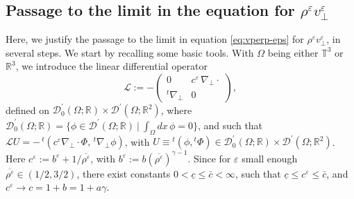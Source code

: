 \documentclass[11pt,reqno]{amsart}
\def \R{{\mathbb{R}}}
\def \T{{\mathbb{T}}}
\begin{document}

\subsection{Passage to the limit in the equation for $\rho^\varepsilon v_\perp^\varepsilon $}
\label{ss:cv-rvperp-P}
Here, we justify the passage to the limit in equation \eqref{eq:vperp-eps} for $\rho^\varepsilon v_\perp^\varepsilon$, in several steps.
We start by recalling some basic tools. With $\Omega$ being either $\T^3$ or $\R^3$, we introduce the linear differential operator
\begin{equation}
  \label{eqn:LDOL}
  \mathcal L := -\left (\begin{array}{cc}
0 &   c^\varepsilon \, \nabla_\perp \cdot \\
{}^t \nabla_\perp & 0
  \end{array}
  \right),
\end{equation}
defined on $\mathcal D_0^\prime(\Omega;\R) \times \mathcal D^\prime(\Omega;\R^2) $, where $ \mathcal D_0^\prime(\Omega;\R)= \{\phi \in \mathcal D^\prime(\Omega;\R) \ | \ \int_{\Omega}dx\, \phi=0 \}$, and such that $\mathcal{L} U = -\,{}^t(c^\varepsilon \nabla_\perp \cdot  \Phi,\, {}^t\nabla_\perp \phi)$, with $ U\equiv {}^t(\phi,{}^t\Phi) \in \mathcal D_0^\prime(\Omega;\R) \times \mathcal D^\prime(\Omega;\R^2) $. Here $c^\varepsilon:=b^\varepsilon + 1/\overline{\rho^\varepsilon}$, with $b^\varepsilon:=b (\overline{\rho^\varepsilon})^{\gamma-1}$. Since for $\varepsilon$ small enough $\overline{\rho^\varepsilon} \in (1/2,3/2)$, there exist constants $0<\underline {c} \leq \bar {c} <\infty$, such that $\underline {c} \leq c^\varepsilon \leq \bar {c}$, and $c^\varepsilon \rightarrow c = 1+ b = 1+ a \gamma$.
\end{document}
